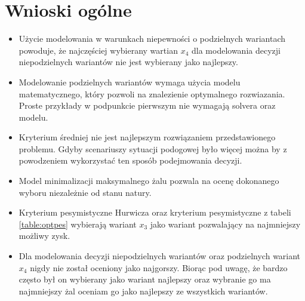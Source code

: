 \documentclass{article}
\begin{document}
\section{Wnioski ogólne}

\begin{itemize}
    \item Użycie modelowania w warunkach niepewności o podzielnych wariantach powoduje, że najczęściej wybierany 
      wartian $x_4$ dla modelowania decyzji niepodzielnych wariantów nie jest wybierany jako najlepszy. 
    \item Modelowanie podzielnych wariantów wymaga użycia modelu matematycznego, który pozwoli na znalezienie optymalnego
      rozwiazania. Proste przykłady w podpunkcie pierwszym nie wymagają solvera oraz modelu.
    \item Kryterium średniej nie jest najlepszym rozwiązaniem przedstawionego problemu. Gdyby scenariuszy sytuacji podogowej było więcej można by z powodzeniem wykorzystać ten sposób podejmowania decyzji.
    \item Model minimalizacji maksymalnego żalu pozwala na ocenę dokonanego wyboru niezależnie od stanu natury. 
    \item Kryterium pesymistyczne Hurwicza oraz kryterium pesymistyczne z tabeli \ref{table:optpes} wybierają
    wariant $x_3$ jako wariant pozwalający na najmniejszy możliwy zysk.
    \item Dla modelowania decyzji niepodzielnych wariantów oraz podzielnych wariant $x_4$ nigdy nie został oceniony jako najgorszy. Biorąc pod uwagę, że bardzo często był on wybierany jako wariant najlepszy oraz wybranie go ma najmniejszy żal oceniam go jako najlepszy ze wszystkich wariantów.
\end{itemize}
\end{document}
